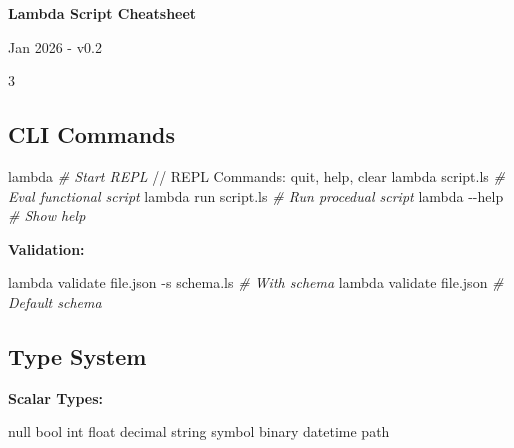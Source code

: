 \documentclass[8pt,landscape,a4paper,oneside]{article}
\newenvironment{Shaded}{%
  \begin{snugshade}%
  \vspace{0.4\baselineskip}%
  \fontsize{9}{10}\selectfont%
  \setlength{\parskip}{0pt}%
  \setlength{\topsep}{0pt}%
  \setlength{\partopsep}{0pt}%
}{%
  \vspace{0.01\baselineskip}%
  \end{snugshade}%
}
\newcommand{\CommentTok}[1]{\textcolor[rgb]{0.56,0.35,0.01}{\textit{#1}}}
\newcommand{\ExtensionTok}[1]{#1}
\newcommand{\AttributeTok}[1]{\textcolor[rgb]{0.77,0.63,0.00}{#1}}
\newcommand{\NormalTok}[1]{#1}
\begin{document}
\begin{center}
{\Large \textbf{Lambda Script Cheatsheet}}
\end{center}
\vspace{-8pt}
\begin{flushright}
{\small Jan 2026 - v0.2}
\end{flushright}

\vspace{3pt}

\begin{multicols*}{3}
\raggedright
\subsection{CLI Commands}\label{cli-commands}

\begin{Shaded}
\begin{Highlighting}[]
\ExtensionTok{lambda}                    \CommentTok{\# Start REPL}
\ExtensionTok{//}\NormalTok{ REPL Commands: quit, help, clear}
\ExtensionTok{lambda}\NormalTok{ script.ls          }\CommentTok{\# Eval functional script}
\ExtensionTok{lambda}\NormalTok{ run script.ls      }\CommentTok{\# Run procedual script}
\ExtensionTok{lambda} \AttributeTok{{-}{-}help}             \CommentTok{\# Show help}
\end{Highlighting}
\end{Shaded}

\textbf{Validation:}

\begin{Shaded}
\begin{Highlighting}[]
\ExtensionTok{lambda}\NormalTok{ validate file.json }\AttributeTok{{-}s}\NormalTok{ schema.ls  }\CommentTok{\# With schema}
\ExtensionTok{lambda}\NormalTok{ validate file.json            }\CommentTok{\# Default schema}
\end{Highlighting}
\end{Shaded}

\subsection{Type System}\label{type-system}

\textbf{Scalar Types:}

\begin{Shaded}
\begin{Highlighting}[]
\NormalTok{null  bool  int  float  decimal}
\NormalTok{string  symbol  binary  datetime  path}
\end{Highlighting}
\end{Shaded}


\end{multicols*}
\end{document}

